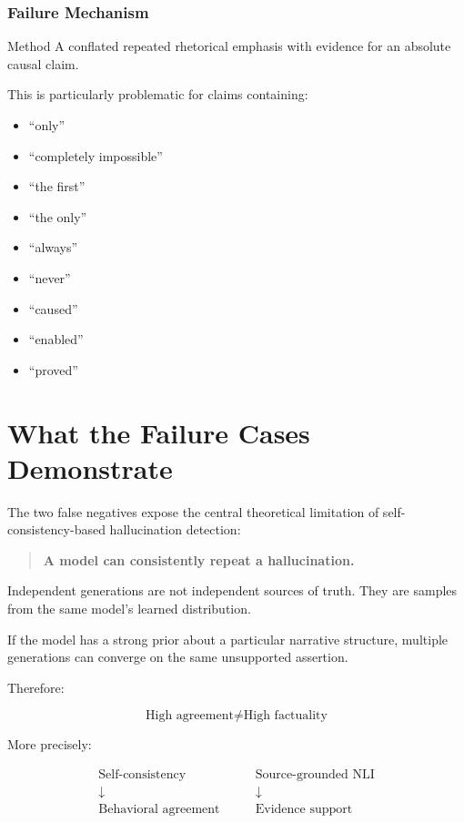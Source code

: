 \documentclass[11pt,a4paper]{article}
\begin{document}
\subsubsection{Failure Mechanism}

Method A conflated repeated rhetorical emphasis with evidence for an absolute causal claim.

This is particularly problematic for claims containing:

\begin{itemize}
    \item ``only''
    \item ``completely impossible''
    \item ``the first''
    \item ``the only''
    \item ``always''
    \item ``never''
    \item ``caused''
    \item ``enabled''
    \item ``proved''
\end{itemize}


\section{What the Failure Cases Demonstrate}

The two false negatives expose the central theoretical limitation of self-consistency-based hallucination detection:

\begin{quote}
\textbf{A model can consistently repeat a hallucination.}
\end{quote}

Independent generations are not independent sources of truth. They are samples from the same model's learned distribution.

If the model has a strong prior about a particular narrative structure, multiple generations can converge on the same unsupported assertion.

Therefore:

\[
\text{High agreement} \neq \text{High factuality}
\]

More precisely:

\[
\begin{array}{c}
\text{Self-consistency}\\
\downarrow\\
\text{Behavioral agreement}
\end{array}
\qquad
\begin{array}{c}
\text{Source-grounded NLI}\\
\downarrow\\
\text{Evidence support}
\end{array}
\]
\end{document}
